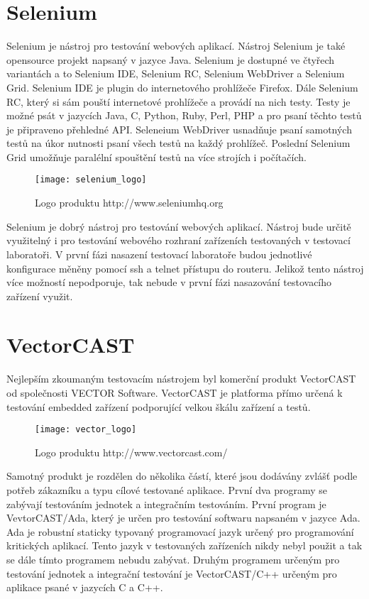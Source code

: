 \section{Selenium}
Selenium je nástroj pro testování webových aplikací. Nástroj Selenium je také opensource projekt napsaný v jazyce Java. Selenium je dostupné ve čtyřech variantách a to Selenium IDE, Selenium RC, Selenium WebDriver a Selenium Grid. Selenium IDE je plugin do internetového prohlížeče Firefox. Dále Selenium RC, který si sám pouští internetové prohlížeče a provádí na nich testy. Testy je možné psát v jazycích Java, C, Python, Ruby, Perl, PHP a pro psaní těchto testů je připraveno přehledné API. Seleneium WebDriver usnadňuje psaní samotných testů na úkor nutnosti psaní všech testů na každý prohlížeč. Poslední Selenium Grid umožňuje paralélní spouštění testů na více strojích i počítačích.

\begin{figure}[h]
  \centering
  \texttt{[image: selenium\_logo]}
  \caption{Logo produktu http://www.seleniumhq.org}
  \label{fig:selenium_logo}
\end{figure}

Selenium je dobrý nástroj pro testování webových aplikací. Nástroj bude určitě využitelný i pro testování webového rozhraní zařízeních testovaných v testovací laboratoři. V první fázi nasazení testovací laboratoře budou jednotlivé konfigurace měněny pomocí ssh a telnet přístupu do routeru. Jelikož tento nástroj více možností nepodporuje, tak nebude v první fázi nasazování testovacího zařízení využit.

\section{VectorCAST}
Nejlepším zkoumaným testovacím nástrojem byl komerční produkt VectorCAST od společnosti VECTOR Software. VectorCAST je platforma přímo určená k testování embedded zařízení podporující velkou škálu zařízení a testů.

\begin{figure}[h]
  \centering
  \texttt{[image: vector\_logo]}
  \caption{Logo produktu http://www.vectorcast.com/}
  \label{fig:vector_logo}
\end{figure}

Samotný produkt je rozdělen do několika částí, které jsou dodávány zvlášť podle potřeb zákazníku a typu cílové testované aplikace. První dva programy se zabývají testováním jednotek a integračním testováním. První program je VevtorCAST/Ada, který je určen pro testování softwaru napsaném v jazyce Ada. Ada je robustní staticky typovaný programovací jazyk určený pro programování kritických aplikací. Tento jazyk v testovaných zařízeních nikdy nebyl použit a tak se dále tímto programem nebudu zabývat. Druhým programem určeným pro testování jednotek a integrační testování je VectorCAST/C++ určeným pro aplikace psané v jazycích C a C++.

